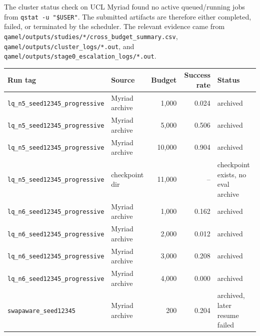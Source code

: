 \documentclass[11pt]{article}
\newcommand{\code}[1]{\texttt{#1}}
\newcommand{\file}[1]{\texttt{\small #1}}
\begin{document}
The cluster status check on UCL Myriad found no active queued/running jobs from
\code{qstat -u "\$USER"}. The submitted artifacts are therefore either completed,
failed, or terminated by the scheduler. The relevant evidence came from
\file{qamel/outputs/studies/*/cross\_budget\_summary.csv},
\file{qamel/outputs/cluster\_logs/*.out}, and
\file{qamel/outputs/stage0\_escalation\_logs/*.out}.

\begin{center}
\begin{tabular}{llrrl}
\toprule
Run tag & Source & Budget & Success rate & Status \\
\midrule
\code{lq\_n5\_seed12345\_progressive} & Myriad archive & 1{,}000 & 0.024 & archived \\
\code{lq\_n5\_seed12345\_progressive} & Myriad archive & 5{,}000 & 0.506 & archived \\
\code{lq\_n5\_seed12345\_progressive} & Myriad archive & 10{,}000 & 0.904 & archived \\
\code{lq\_n5\_seed12345\_progressive} & checkpoint dir & 11{,}000 & -- & checkpoint exists, no eval archive \\
\code{lq\_n6\_seed12345\_progressive} & Myriad archive & 1{,}000 & 0.162 & archived \\
\code{lq\_n6\_seed12345\_progressive} & Myriad archive & 2{,}000 & 0.012 & archived \\
\code{lq\_n6\_seed12345\_progressive} & Myriad archive & 3{,}000 & 0.208 & archived \\
\code{lq\_n6\_seed12345\_progressive} & Myriad archive & 4{,}000 & 0.000 & archived \\
\code{swapaware\_seed12345} & Myriad archive & 200 & 0.204 & archived, later resume failed \\
\bottomrule
\end{tabular}
\end{center}
\end{document}
